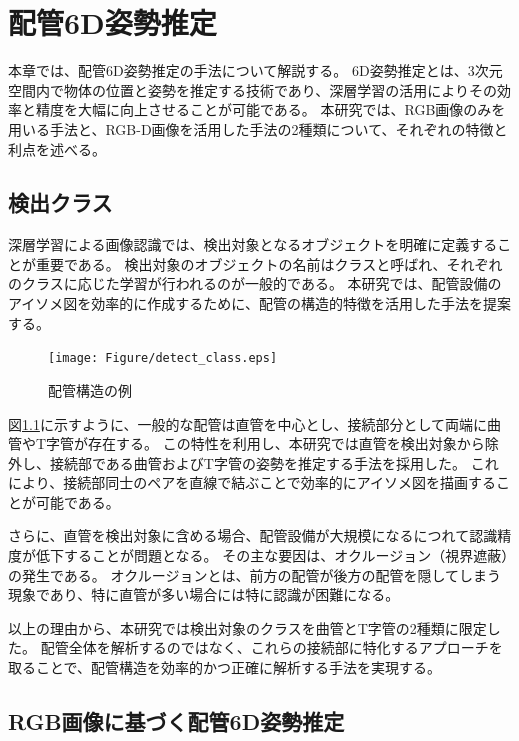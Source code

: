 \chapter{配管6D姿勢推定}
本章では、配管6D姿勢推定の手法について解説する。
6D姿勢推定とは、3次元空間内で物体の位置と姿勢を推定する技術であり、深層学習の活用によりその効率と精度を大幅に向上させることが可能である。
本研究では、RGB画像のみを用いる手法と、RGB-D画像を活用した手法の2種類について、それぞれの特徴と利点を述べる。


\section{検出クラス}
深層学習による画像認識では、検出対象となるオブジェクトを明確に定義することが重要である。
検出対象のオブジェクトの名前はクラスと呼ばれ、それぞれのクラスに応じた学習が行われるのが一般的である。
本研究では、配管設備のアイソメ図を効率的に作成するために、配管の構造的特徴を活用した手法を提案する。

\begin{figure}[htbt]
	\centering
	 \texttt{[image: Figure/detect\_class.eps]}
	 \caption{配管構造の例}
	 \label{fig:f1}
\end{figure}

図\ref{fig:f1}に示すように、一般的な配管は直管を中心とし、接続部分として両端に曲管やT字管が存在する。
この特性を利用し、本研究では直管を検出対象から除外し、接続部である曲管およびT字管の姿勢を推定する手法を採用した。
これにより、接続部同士のペアを直線で結ぶことで効率的にアイソメ図を描画することが可能である。

さらに、直管を検出対象に含める場合、配管設備が大規模になるにつれて認識精度が低下することが問題となる。
その主な要因は、オクルージョン（視界遮蔽）の発生である。
オクルージョンとは、前方の配管が後方の配管を隠してしまう現象であり、特に直管が多い場合には特に認識が困難になる。

以上の理由から、本研究では検出対象のクラスを曲管とT字管の2種類に限定した。
配管全体を解析するのではなく、これらの接続部に特化するアプローチを取ることで、配管構造を効率的かつ正確に解析する手法を実現する。


\section{RGB画像に基づく配管6D姿勢推定}
